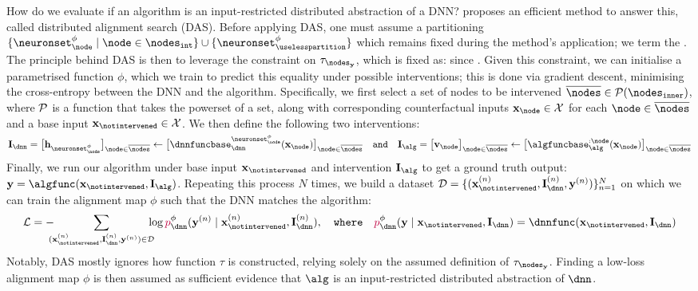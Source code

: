 \documentclass{article}
\newcommand{\prob}{p}
\newcommand{\bx}{\mathbf{x}}
\newcommand{\calX}{\mathcal{X}}
\newcommand{\by}{\mathbf{y}}
\newcommand{\calY}{\mathcal{Y}}
\newcommand{\algfuncnode}[1]{\algfuncbase_{\alg}^{#1}}
\newcommand{\nodesvalues}{\mathbf{v}}
\newcommand{\nodesoutput}{\nodes_{\by}}
\newcommand{\nodesinner}{\nodes_{\mathtt{inner}}}
\newcommand{\dnnfunclayer}[1]{\dnnfuncbase_{\dnn}^{#1}}
\newcommand{\hiddenstates}{\mathbf{h}}
\newcommand{\pdnncausal}{{\textcolor{\colourdnn}{\prob}}^{\causalmap}_{\dnn}}
\newcommand{\nlayers}{L}
\newcommand{\lossfunc}{\mathcal{L}}
\newcommand{\dataset}{\mathcal{D}}
\newcommand{\causalmap}{\phi}
\newcommand{\abstractionmap}{\tau}
\begin{document}
How do we evaluate if an algorithm is an input-restricted distributed abstraction of a DNN?
\citet{Geiger2023FindingAB} proposes an efficient method to answer this, called distributed alignment search (DAS).
Before applying DAS, one must assume a partitioning $\{\neuronset^{\causalmap}_{\node} \mid \node \in \nodesint\} \cup \{\neuronset^{\causalmap}_{\uselesspartition}\}$ which  remains fixed during the method's application; we term \smash{$|\neuronset^{\causalmap}_{\node}|$} the .
The principle behind DAS is then to leverage the constraint on $\tau_{\nodesoutput}$, which is fixed as: \smash{$\nodesvalues_{\nodesoutput} = \argmax_{\by \in \calY} \pdnn(\by \mid \bx)$} since
\smash{$\pdnn(\by \mid \bx) = \hiddenstates_{\neuronset_{\nlayers\!+\!1}}$}.
Given this constraint, we can initialise a parametrised function $\causalmap$, which we train to predict this equality under possible interventions; this is done via gradient descent, minimising the cross-entropy between the DNN and the algorithm.
Specifically, we first select a set of nodes to be intervened $\nodesintervened \in \powerset(\nodesinner)$, where $\mathcal{P}$ is a function that takes the powerset of a set, along with corresponding counterfactual inputs $\xnode \in \calX$ for each $\node \in \nodesintervened$ and a base input $\xnotintervened \in \calX$.
We then define the following two interventions:
\begin{align}
    \smash{\interventions_{\dnn} = \big[\hiddenstates_{\neuronset^{\causalmap}_{\node}}\big]_{\node \in \nodesintervened} \leftarrow \big[\dnnfunclayer{\neuronset^\causalmap_\node}(\xnode)\big]_{\node \in \nodesintervened}} 
    \quad \texttt{and} \quad
    \smash{\interventions_{\alg} = \big[\nodesvalues_{\node}\big]_{\node \in \nodesintervened} \leftarrow \big[\algfuncnode{:\node}(\xnode)\big]_{\node\in \nodesintervened}}
\end{align}
Finally, we run our algorithm under base input $\xnotintervened$ and intervention $\interventions_{\alg}$ to get a ground truth output: $\by = \algfunc(\xnotintervened, \interventions_{\alg})$.
Repeating this process $N$ times, we build a dataset $\dataset = \{(\xnotinterveneddata, \interventiondata_{\dnn}, \bydata)\}_{n=1}^{N}$ on which we can train the alignment map $\causalmap$ such that the DNN matches the algorithm:
\begin{align} \label{eq:loss_das}
    \lossfunc = - \!\!\!\! \sum_{(\xnotinterveneddata, \interventiondata_{\dnn}, \bydata) \in \dataset} \!\!\!\! \log \pdnncausal(\bydata \mid \xnotinterveneddata,\interventiondata_{\dnn}), \quad
    \mathtt{where}\quad
    \pdnncausal(\by \mid \xnotintervened, \interventions_{\dnn}) = \dnnfunc(\xnotintervened, \interventions_{\dnn})
\end{align}
Notably, DAS mostly ignores how function $\abstractionmap$ is constructed, relying solely on the assumed definition of $\abstractionmap_{\nodesoutput}$.
Finding a low-loss alignment map $\causalmap$ is then assumed as sufficient evidence that $\alg$ is an input-restricted distributed abstraction of $\dnn$.
\end{document}
